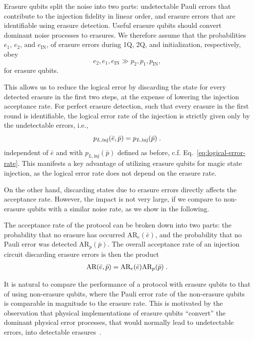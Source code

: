\documentclass[twocolumn,
notitlepage,
aps,
prx,
floatfix,
superscriptaddress
]{revtex4-2}
\begin{document}
Erasure qubits split the noise into two parts: undetectable Pauli errors that contribute to the injection fidelity in linear order, and erasure errors that are identifiable using erasure detection. 
Useful erasure qubits should convert dominant noise processes to erasures. We therefore assume that the probabilities $e_1$, $e_2$, and $e_\text{IN}$, of erasure errors during 1Q, 2Q, and initialization, respectively, obey
\begin{equation} \label{eq: e>>p}
e_2 ,e_1, e_\text{IN} \gg p_2 ,p_1, p_\text{IN},
\end{equation}
for erasure qubits.
 
This allows us to reduce the logical error by discarding the state for every detected erasure in the first two steps, at the expense of lowering the injection acceptance rate.
For perfect erasure detection, such that every erasure in the first round is identifiable, the logical error rate of the injection is strictly given only by the undetectable errors, i.e.,
\begin{equation} \label{eq:erasure-logical-rate}
    p_{L,\text{inj}} \qty(\bar{e}, \bar{p}) =  p_{L,\text{inj}} \qty(\bar{p}) \;.
\end{equation}
independent of $\bar e$ and with $p_{L,\text{inj}}(\bar p)$ defined as before, c.f. Eq.~\eqref{eq:logical-error-rate}.  %
This manifests a key advantage of utilizing erasure qubits for magic state injection, as the logical error rate does not depend on the erasure rate. 

On the other hand, discarding states due to erasure errors directly affects the acceptance rate. However, the impact is not very large, if we compare to non-erasure qubits with a similar noise rate, as we show in the following.

The acceptance rate of the protocol can be broken down into two parts: the probability that no erasure has occurred $\text{AR}_e(\bar{e})$, and the probability that no Pauli error was detected $\text{AR}_p(\bar{p})$. 
The overall acceptance rate of an injection circuit discarding erasure errors is then the product
\begin{align}
    \text{AR} \qty(\bar{e},\bar{p}) = \text{AR}_e \qty(\bar{e})
    \text{AR}_p \qty(\bar{p})
    \;.
\end{align}

It is natural to compare the performance of a protocol with erasure qubits to that of using non-erasure qubits, where the Pauli error rate of the non-erasure qubits is comparable in magnitude to the erasure rate. This is motivated by the observation that physical implementations of erasure qubits ``convert'' the dominant physical error processes, that would normally lead to undetectable errors, into detectable erasures~\cite{Ma_2023atom_exp,Scholl_2023atom_exp,koottandavida2024erasure,Levine_2024}.
\end{document}

